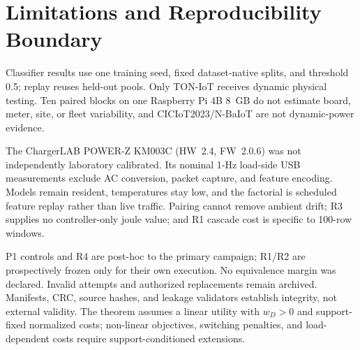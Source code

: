 \section{Limitations and Reproducibility Boundary}
\label{sec:limits}
Classifier results use one training seed, fixed dataset-native splits, and threshold 0.5; replay reuses held-out pools. Only TON-IoT receives dynamic physical testing. Ten paired blocks on one Raspberry Pi 4B 8~GB do not estimate board, meter, site, or fleet variability, and CICIoT2023/N-BaIoT are not dynamic-power evidence.

The ChargerLAB POWER-Z KM003C (HW~2.4, FW~2.0.6) was not independently laboratory calibrated. Its nominal 1-Hz load-side USB measurements exclude AC conversion, packet capture, and feature encoding. Models remain resident, temperatures stay low, and the factorial is scheduled feature replay rather than live traffic. Pairing cannot remove ambient drift; R3 supplies no controller-only joule value; and R1 cascade cost is specific to 100-row windows.

P1 controls and R4 are post-hoc to the primary campaign; R1/R2 are prospectively frozen only for their own execution. No equivalence margin was declared. Invalid attempts and authorized replacements remain archived. Manifests, CRC, source hashes, and leakage validators establish integrity, not external validity. The theorem assumes a linear utility with $w_D>0$ and support-fixed normalized costs; non-linear objectives, switching penalties, and load-dependent costs require support-conditioned extensions.
